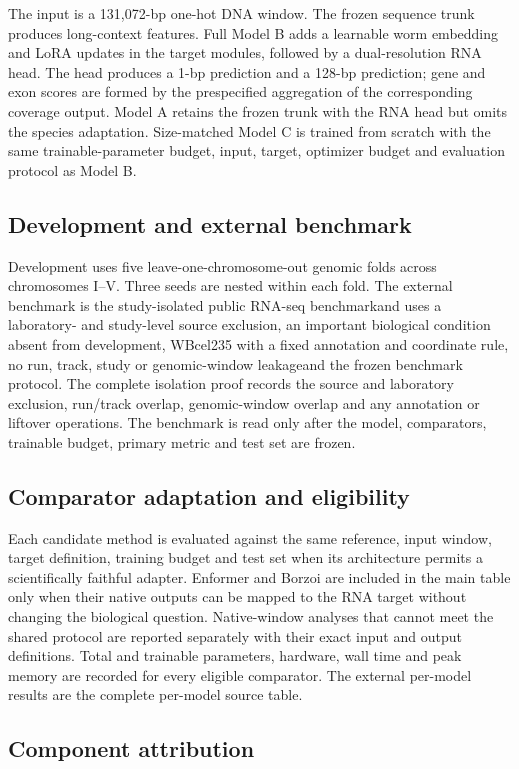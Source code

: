 \documentclass[pdflatex,sn-nature]{sn-jnl}
\newcommand{\ExtBenchmarkDataset}{the study-isolated public RNA-seq benchmark}
\newcommand{\ExtIsolation}{a laboratory- and study-level source exclusion}
\newcommand{\ExtCondition}{an important biological condition absent from development}
\newcommand{\ExtCoordinate}{WBcel235 with a fixed annotation and coordinate rule}
\newcommand{\ExtLeakage}{no run, track, study or genomic-window leakage}
\newcommand{\ExtProtocol}{the frozen benchmark protocol}
\newcommand{\ExtBaselines}{the complete per-model source table}
\begin{document}
The input is a 131,072-bp one-hot DNA window. The frozen sequence trunk produces
long-context features. Full Model B adds a learnable worm embedding and LoRA
updates in the target modules, followed by a dual-resolution RNA head. The head
produces a 1-bp prediction and a 128-bp prediction; gene and exon scores are
formed by the prespecified aggregation of the corresponding coverage output.
Model A retains the frozen trunk with the RNA head but omits the species
adaptation. Size-matched Model C is trained from scratch with the same
trainable-parameter budget, input, target, optimizer budget and evaluation
protocol as Model B.

\subsection{Development and external benchmark}

Development uses five leave-one-chromosome-out genomic folds across chromosomes
I--V. Three seeds are nested within each fold. The external benchmark is
\ExtBenchmarkDataset and uses \ExtIsolation, \ExtCondition, \ExtCoordinate,
\ExtLeakage and \ExtProtocol. The complete isolation proof records the source
and laboratory exclusion, run/track overlap, genomic-window overlap and any
annotation or liftover operations. The benchmark is read only after the model,
comparators, trainable budget, primary metric and test set are frozen.

\subsection{Comparator adaptation and eligibility}

Each candidate method is evaluated against the same reference, input window,
target definition, training budget and test set when its architecture permits a
scientifically faithful adapter. Enformer and Borzoi are included in the main
table only when their native outputs can be mapped to the RNA target without
changing the biological question. Native-window analyses that cannot meet the
shared protocol are reported separately with their exact input and output
definitions. Total and trainable parameters, hardware, wall time and peak
memory are recorded for every eligible comparator. The external per-model
results are \ExtBaselines.

\subsection{Component attribution}
\end{document}
